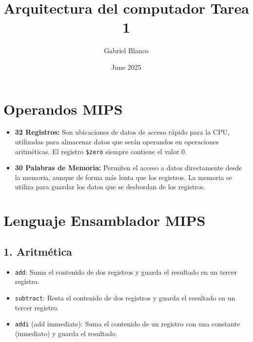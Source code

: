 \documentclass{article}
\title{Arquitectura del computador Tarea 1}
\author{Gabriel Blanco}
\date{June 2025}
\begin{document}
\section*{Operandos MIPS}

\begin{itemize}
    \item \textbf{32 Registros:} Son ubicaciones de datos de acceso rápido para la CPU, utilizadas para almacenar datos que serán operandos en operaciones aritméticas. El registro \texttt{\$zero} siempre contiene el valor 0.
    \item \textbf{30 Palabras de Memoria:} Permiten el acceso a datos directamente desde la memoria, aunque de forma más lenta que los registros. La memoria se utiliza para guardar los datos que se desbordan de los registros.
\end{itemize}

\section*{Lenguaje Ensamblador MIPS}

\subsection*{1. Aritmética}
\begin{itemize}
    \item \texttt{add}: Suma el contenido de dos registros y guarda el resultado en un tercer registro.
    \item \texttt{subtract}: Resta el contenido de dos registros y guarda el resultado en un tercer registro.
    \item \texttt{addi} (add immediate): Suma el contenido de un registro con una constante (inmediato) y guarda el resultado.
\end{itemize}
\end{document}
